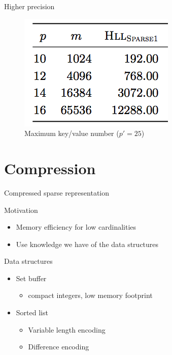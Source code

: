 \documentclass{beamer}
\begin{document}
\begin{frame}{Higher precision}


\begin{figure}[c]
\includegraphics [scale=0.45]  {sparse1.png}
\caption{Maximum key/value number ($p' = 25$)}
\end{figure}

\end{frame}



\section{Compression}
\begin{frame}{Compressed sparse representation}


  \begin{block}{Motivation}
    \begin{itemize}
      \item Memory efficiency for low cardinalities
      \item Use knowledge we have of the data structures
    \end{itemize}
  \end{block}


  \begin{block}{Data structures}
    \begin{itemize}
      \item Set buffer
        \begin{itemize}
        \item compact integers, low memory footprint
        \end{itemize}
      \item Sorted list
      \begin{itemize}
        \item Variable length encoding
        \item Difference encoding
      \end{itemize}
    \end{itemize}
  \end{block}


\end{frame}
\end{document}
